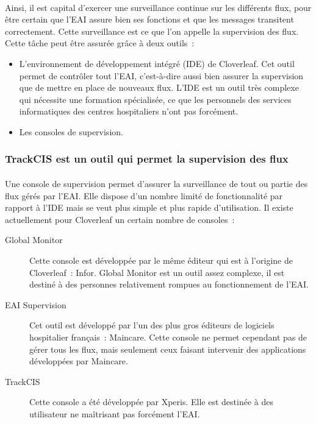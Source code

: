			\paragraph{}%
			Ainsi, il est capital d'exercer une surveillance continue sur les différents
			flux, pour être certain que l'EAI assure bien ses fonctions et que les
			messages transitent correctement. Cette surveillance est ce que l'on appelle
			la supervision des flux. Cette tâche peut être assurée grâce à deux outils~:
			\begin{itemize}
			  \item L'environnement de développement intégré (IDE) de Cloverleaf. Cet
			  outil permet de contrôler tout l'EAI, c'est-à-dire aussi bien assurer la
			  supervision que de mettre en place de nouveaux flux. L'IDE est un outil
			  très complexe qui nécessite une formation spécialisée, ce que les
			  personnels des services informatiques des centres hospitaliers n'ont pas
			  forcément.
			  \item Les consoles de supervision.
			\end{itemize}
			
		\subsubsection{TrackCIS est un outil qui permet la supervision des flux}
			\paragraph{}%
			Une console de supervision permet d'assurer la surveillance
			de tout ou partie des flux gérés par l'EAI. Elle dispose d'un
			nombre limité de fonctionnalité par rapport à l'IDE mais se veut plus simple
			et plus rapide d'utilisation. Il existe actuellement pour Cloverleaf un
			certain nombre de consoles~:
			\begin{description}
				\item[Global Monitor] Cette console est développée par le même éditeur qui
				est à l'origine de Cloverleaf~: Infor. Global Monitor est un outil assez
				complexe, il est destiné à des personnes relativement rompues au
				fonctionnement de l'EAI.
				\item[EAI Supervision] Cet outil est développé par l'un des plus gros
				éditeurs de logiciels hospitalier français~: Maincare. Cette console ne
				permet cependant pas de gérer tous les flux, mais seulement ceux faisant
				intervenir des applications développées par Maincare.
				\item[TrackCIS] Cette console a été développée par Xperis. Elle est destinée
				à des utilisateur ne maîtrisant pas forcément l'EAI.
			\end{description}
			
